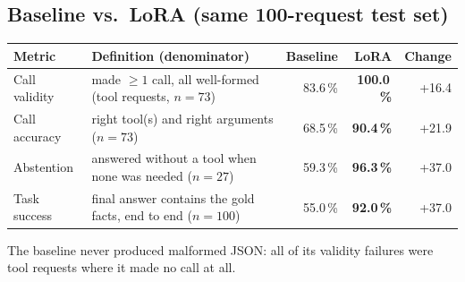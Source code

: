 \documentclass[12pt,a4paper]{article}
\begin{document}
\subsection{Baseline vs.\ LoRA (same 100-request test set)}
\begin{center}
\begin{tabular}{@{}llrrr@{}}
    \toprule
    \textbf{Metric} & \textbf{Definition (denominator)} & \textbf{Baseline} & \textbf{LoRA} & \textbf{Change} \\
    \midrule
    Call validity & made $\geq 1$ call, all well-formed (tool requests, $n=73$) & 83.6\,\% & \textbf{100.0\,\%} & +16.4 \\
    Call accuracy & right tool(s) and right arguments ($n=73$) & 68.5\,\% & \textbf{90.4\,\%} & +21.9 \\
    Abstention & answered without a tool when none was needed ($n=27$) & 59.3\,\% & \textbf{96.3\,\%} & +37.0 \\
    Task success & final answer contains the gold facts, end to end ($n=100$) & 55.0\,\% & \textbf{92.0\,\%} & +37.0 \\
    \bottomrule
\end{tabular}
\end{center}
The baseline never produced malformed JSON: all of its validity failures were tool requests where it made no call at all.
\end{document}
